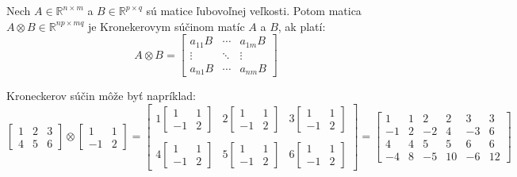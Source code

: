\begin{definition}
Nech $A \in \mathbb{R}^{n\times m}$ a $B \in \mathbb{R}^{p \times q}$ sú matice ľubovoľnej veľkosti.
Potom matica $A \otimes B \in \mathbb{R}^{np \times mq}$ je Kronekerovym súčinom matíc $A$ a $B$, ak platí:
$$
A \otimes B = 
\begin{bmatrix} a_{1 1} B & \cdots & a_{1 m} B \\ \vdots & \ddots & \vdots \\ a_{n 1} B & \cdots & a_{n m} B
\end{bmatrix}
$$
\end{definition}

\begin{example}
Kroneckerov súčin môže byť napríklad:
$$
\begin{bmatrix}
1 & 2 & 3 \\ 4 & 5 & 6
\end{bmatrix}
\otimes
\begin{bmatrix} 1 & 1 \\ -1 & 2 \end{bmatrix}
= 
\begin{bmatrix}
1 \begin{bmatrix} 1 & 1 \\ -1 & 2 \end{bmatrix}  &  2 \begin{bmatrix} 1 & 1 \\ -1 & 2 \end{bmatrix} & 3 \begin{bmatrix} 1 & 1 \\ -1 & 2 \end{bmatrix} \\ \\
4 \begin{bmatrix} 1 & 1 \\ -1 & 2 \end{bmatrix} & 5 \begin{bmatrix} 1 & 1 \\ -1 & 2 \end{bmatrix} & 6\begin{bmatrix} 1 & 1 \\ -1 & 2 \end{bmatrix}
\end{bmatrix}
=
\begin{bmatrix}
1 & 1 & 2 & 2 & 3 & 3\\
-1 & 2 & -2 & 4 & -3 & 6\\
4 & 4 & 5 & 5 & 6 & 6\\
-4 & 8 & -5 & 10 & -6 & 12
\end{bmatrix}
$$
\end{example}

